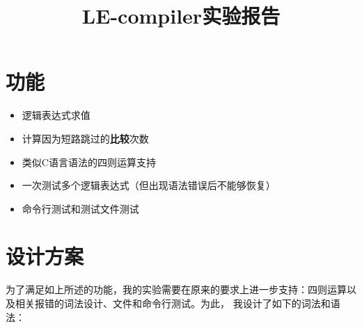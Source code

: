 \documentclass[UTF8,11pt,a4paper]{ctexart}%
\title{\vspace{-6em}LE-compiler实验报告\vspace{-2em}}
\date{}
\begin{document}
\maketitle

\section{功能}\label{section:feat}
\begin{itemize}
    \item 逻辑表达式求值
    \item 计算因为短路跳过的\textbf{比较}次数
    \item 类似C语言语法的四则运算支持
    \item 一次测试多个逻辑表达式（但出现语法错误后不能够恢复）
    \item 命令行测试和测试文件测试
\end{itemize}

\section{设计方案}
\hspace{2em}为了满足如上所述的功能，我的实验需要在原来的要求上进一步支持：四则运算以及相关报错的词法设计、文件和命令行测试。为此，
我设计了如下的词法和语法：
\end{document}
